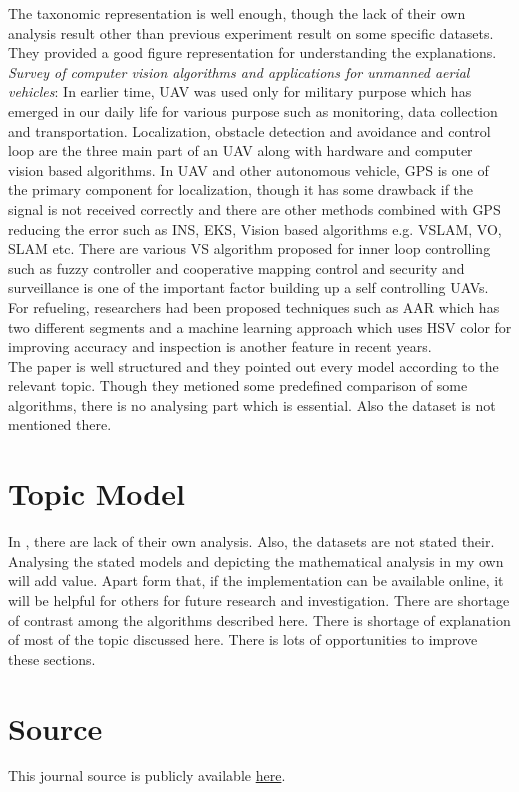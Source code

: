The taxonomic representation is well enough, though the lack of their own analysis result other than previous experiment result on some specific datasets. They provided a good figure representation for understanding the explanations.\\

\textit{Survey of computer vision algorithms and applications for unmanned aerial vehicles}\cite{al-kaff_survey_2018}: In earlier time, UAV was used only for military purpose which has emerged in our daily life for various purpose such as monitoring, data collection and transportation. Localization, obstacle detection and avoidance and control loop are the three main part of an UAV along with hardware and computer vision based algorithms. In UAV and other autonomous vehicle, GPS is one of the primary component for localization, though it has some drawback if the signal is not received correctly and there are other methods combined with GPS reducing the error such as INS, EKS, Vision based algorithms e.g. VSLAM, VO, SLAM etc. There are various VS algorithm proposed for inner loop controlling such as fuzzy controller and cooperative mapping control and security and surveillance is one of the important factor building up a self controlling UAVs. For refueling, researchers had been proposed techniques such as AAR which has two different segments and a machine learning approach which uses HSV color for improving accuracy and inspection is another feature in recent years.\\

The paper  is well structured and they pointed out every model according to the relevant topic. Though they metioned some predefined comparison of some algorithms, there is no analysing part which is essential. Also the dataset is not mentioned there.

\section{Topic Model}
In \cite{colyer_review_2018,feng_computer_2019,al-kaff_survey_2018,akhtar_threat_2018}, there are lack of their own analysis. Also, the datasets are not stated their. Analysing the stated models and depicting the mathematical analysis in my own will add value. Apart form that, if the implementation can be available online, it will be helpful for others for future research and investigation. There are shortage of contrast among the algorithms described here\cite{akhtar_threat_2018,colyer_review_2018,}. There is shortage of explanation of most of the topic discussed here\cite{al-kaff_survey_2018}. There is lots of opportunities to improve these sections.

\section{Source}
This journal source is publicly available \href{https://github.com/shadhinaust/cs-6000-journal-3.git}{here}.





